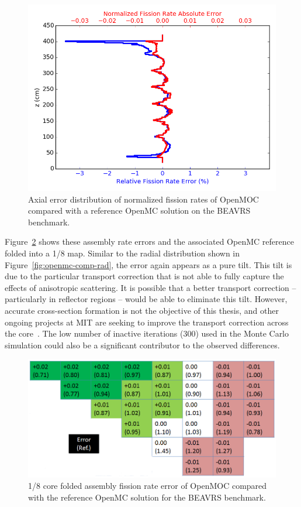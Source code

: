 \begin{figure}[ht!]
	\centering
	\includegraphics[width=0.7\linewidth]{figures/results/full-core/twin_axial_error.png}
	\caption{Axial error distribution of normalized fission rates of OpenMOC compared with a reference OpenMC solution on the BEAVRS benchmark.}
	\label{fig:openmc-comp-ax}
\end{figure}

Figure~\ref{fig:assembly-rr} shows these assembly rate errors and the associated OpenMC reference folded into a 1/8 map. Similar to the radial distribution shown in Figure~\ref{fig:openmc-comp-rad}, the error again appears as a pure tilt. This tilt is due to the particular transport correction that is not able to fully capture the effects of anisotropic scattering. It is possible that a better transport correction -- particularly in reflector regions -- would be able to eliminate this tilt. However, accurate cross-section formation is not the objective of this thesis, and other ongoing projects at MIT are seeking to improve the transport correction across the core~\cite{johnny,guillaume}. The low number of inactive iterations (300) used in the Monte Carlo simulation could also be a significant contributor to the observed differences.

\begin{figure}[ht!]
	\centering
	\includegraphics[width=\linewidth]{figures/results/full-core/folded-1-8-core-assembly-rr-new.png}
	\caption{1/8 core folded assembly fission rate error of OpenMOC compared with the reference OpenMC solution for the BEAVRS benchmark.}
	\label{fig:assembly-rr}
\end{figure}

